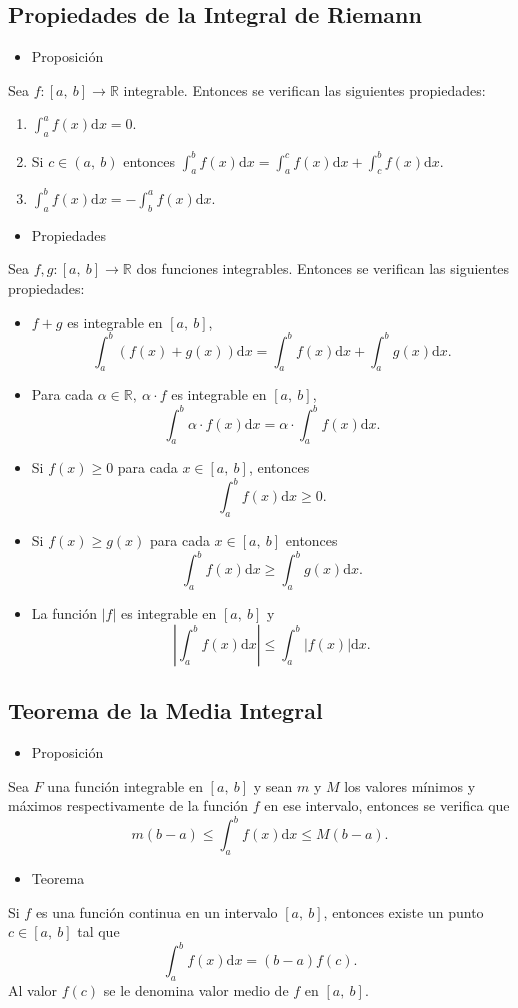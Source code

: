 \subsection{Propiedades de la Integral de Riemann}
\begin{itemize}[label=\color{red}\textbullet, leftmargin=*]
	\item \color{lightblue}Proposición
\end{itemize}
Sea $f:[a,~b]\rightarrow\mathbb{R}$ integrable. Entonces se verifican las siguientes propiedades: 
\begin{enumerate}[label=\arabic*)]
	\item $\int_{a}^{a}f(x)\mathrm{d}x=0$.
	\item Si $c\in(a,~b)$ entonces $\int_a^bf(x)\mathrm{d}x=\int_a^cf(x)\mathrm{d}x+\int_c^bf(x)\mathrm{d}x$.
	\item $\int_a^bf(x)\mathrm{d}x=-\int_b^af(x)\mathrm{d}x$.
\end{enumerate}
\begin{itemize}[label=\color{red}\textbullet, leftmargin=*]
	\item \color{lightblue}Propiedades
\end{itemize}
Sea $f,g:[a,~b]\rightarrow\mathbb{R}$ dos funciones integrables. Entonces se verifican las siguientes propiedades:
\begin{itemize}
	\item $f+g$ es integrable en $[a,~b]$, \[ \int_a^b(f(x)+g(x))\mathrm{d}x=\int_a^bf(x)\mathrm{d}x+\int_a^bg(x)\mathrm{d}x. \]
	\item Para cada $\alpha\in\mathbb{R},~\alpha\cdot f$ es integrable en $[a,~b]$, \[ \int_{a}^{b}\alpha\cdot f(x)\mathrm{d}x=\alpha\cdot\int_{a}^{b}f(x)\mathrm{d}x. \]
	\item Si $f(x)\ge0$ para cada $x\in[a,~b]$, entonces \[ \int_a^bf(x)\mathrm{d}x\ge0. \]
	\item Si $f(x)\ge g(x)$ para cada $x\in[a,~b]$ entonces \[ \int_a^bf(x)\mathrm{d}x\ge\int_a^bg(x)\mathrm{d}x. \]
	\item La función $|f|$ es integrable en $[a,~b]$ y \[ \left|\int_a^bf(x)\mathrm{d}x\right| \le\int_a^b|f(x)|\mathrm{d}x.\]
\end{itemize}
\subsection{Teorema de la Media Integral}
\begin{itemize}[label=\color{red}\textbullet, leftmargin=*]
	\item \color{lightblue}Proposición
\end{itemize}
Sea $F$ una función integrable en $[a,~b]$ y sean $m$ y $M$ los valores mínimos y máximos respectivamente de la función $f$ en ese intervalo, entonces se verifica que \[ m(b-a)\le\int_{a}^{b}f(x)\mathrm{d}x\le M(b-a). \]
\begin{itemize}[label=\color{red}\textbullet, leftmargin=*]
	\item \color{lightblue}Teorema
\end{itemize}
Si $f$ es una función continua en un intervalo $[a,~b]$, entonces existe un punto $c\in[a,~b]$ tal que \[ \int_a^bf(x)\mathrm{d}x=(b-a)f(c). \] Al valor $f(c)$ se le denomina valor medio de $f$ en $[a,~b]$.
